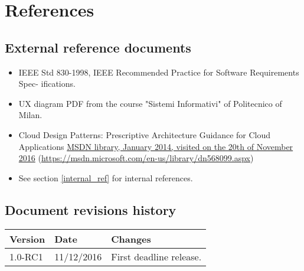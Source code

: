 \section{References}

\subsection{External reference documents}
\label{external_ref}
\begin{itemize}
    \item IEEE Std 830-1998, IEEE Recommended Practice for Software Requirements Spec- ifications.
    \item UX diagram PDF from the course "Sistemi Informativi" of Politecnico of Milan.
    \item Cloud Design Patterns: Prescriptive Architecture Guidance for Cloud Applications \href{https://msdn.microsoft.com/en-us/library/dn568099.aspx}{MSDN library, January 2014, visited on the 20th of November 2016} (\url{https://msdn.microsoft.com/en-us/library/dn568099.aspx})
    \item See section \ref{internal_ref} for internal references.
\end{itemize}



\subsection{Document revisions history}
\begin{tabular}{| l | l | p{10cm} |}
\hline
\textbf{Version} & \textbf{Date} & \textbf{Changes}\\
\hline
1.0-RC1 & 11/12/2016 & First deadline release.\\
\hline
\end{tabular} 